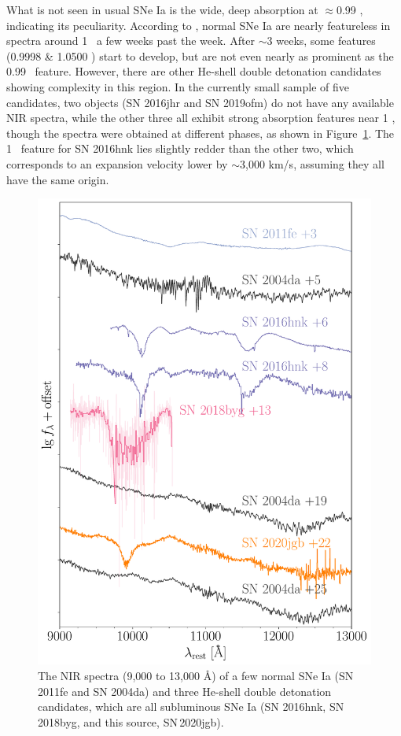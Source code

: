 \documentclass[twocolumn]{aastex631}
\newcommand\sn{SN\,2020jgb}
\begin{document}
What is not seen in usual SNe Ia is the wide, deep absorption at $\approx$0.99 \micron, indicating its peculiarity. According to \citet{Marion2009_NIR}, normal SNe Ia are nearly featureless in spectra around 1 \micron\ a few weeks past the week. After $\sim$3 weeks, some  features (0.9998 \& 1.0500 \micron) start to develop, but are not even nearly as prominent as the 0.99 \micron\ feature. However, there are other He-shell double detonation candidates showing complexity in this region. In the currently small sample of five candidates, two objects (SN 2016jhr and SN 2019ofm) do not have any available NIR spectra, while the other three all exhibit strong absorption features near 1 \micron, though the spectra were obtained at different phases, as shown in Figure~\ref{fig:NIR_comp}. The 1 \micron\ feature for SN 2016hnk lies slightly redder than the other two, which corresponds to an expansion velocity lower by $\sim$3,000 km/s, assuming they all have the same origin. 

\begin{figure}
    \centering
    \includegraphics[width=\linewidth]{NIR_spec_comp.pdf}
    \caption{The NIR spectra (9,000 to 13,000 \AA) of a few normal SNe Ia (SN 2011fe and SN 2004da) and three He-shell double detonation candidates, which are all subluminous SNe Ia (SN 2016hnk, SN 2018byg, and this source, \sn).}
    \label{fig:NIR_comp}
\end{figure}
\end{document}
